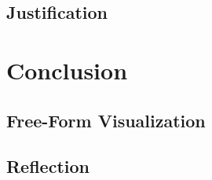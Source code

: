 \documentclass[a4paper,10pt]{article}
\begin{document}
\subsection{Justification}

\section{Conclusion}

\subsection{Free-Form Visualization}

\subsection{Reflection}
\end{document}

